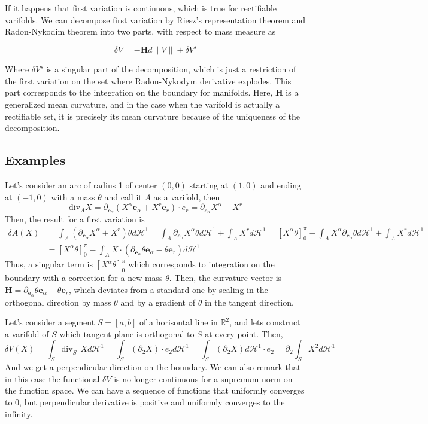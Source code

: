 \vspace{2ex}
If it happens that first variation is continuous, which is true for rectifiable
varifolds. We can decompose first variation by Riesz's representation theorem and
Radon-Nykodim theorem into two parts, with respect to mass measure as

\[\delta V = -\mathbf Hd\|V\|+\delta V^s\]

Where $\delta V^s$ is a singular part of the decomposition, which is just a restriction
of the first variation on the set where Radon-Nykodym derivative explodes. This
part corresponds to the integration on the boundary for manifolds. Here, $\mathbf H$
is a generalized mean curvature, and in the case when the varifold is actually
a rectifiable set, it is precisely its mean curvature because of the uniqueness of
the decomposition.

\subsection{Examples}
Let's consider an arc of radius 1 of center $(0,0)$ starting at $(1,0)$
and ending at $(-1,0)$ with a mass $\theta$ and call it $A$ as a varifold, then
\[\text{div}_AX=\partial_{\mathbf e_\alpha}(X^\alpha\mathbf e_\alpha+X^r\mathbf e_r)\cdot e_r
=\partial_{\mathbf e_\alpha}X^\alpha+X^r\]
Then, the result for a first variation is
\begin{align*}
\delta A(X)&=\int_A(\partial_{\mathbf e_\alpha}X^\alpha+X^r)\theta d\mathcal H^1
=\int_A\partial_{\mathbf e_\alpha}X^\alpha\theta d\mathcal H^1+\int_A X^rd\mathcal H^1
=[X^\alpha\theta]_0^\pi-\int_AX^\alpha\partial_{\mathbf e_\alpha}\theta d\mathcal H^1+\int_A X^rd\mathcal H^1\\
&=[X^\alpha\theta]_0^\pi-\int_AX\cdot(\partial_{\mathbf e_\alpha}\theta\mathbf e_\alpha-\theta\mathbf e_r)d\mathcal H^1
\end{align*}
Thus, a singular term is $[X^\alpha\theta]_0^\pi$ which corresponds to integration
on the boundary with a correction for a new mass $\theta$. Then, the curvature vector
is $\mathbf H=\partial_{\mathbf e_\alpha}\theta\mathbf e_\alpha-\theta\mathbf e_r$,
which deviates from a standard one by scaling in the orthogonal direction by mass
$\theta$ and by a gradient of $\theta$ in the tangent direction.

\vspace{2ex}
Let's consider a segment $S=[a,b]$ of a horisontal line in $\mathbb R^2$, and lets construct a
varifold of $S$ which tangent plane is orthogonal to $S$ at every point. Then,
\[\delta V(X) = \int_S\text{div}_{S^\bot}Xd\mathcal H^1 = \int_S(\partial_2 X)\cdot e_2d\mathcal H^1=
\int_S(\partial_2 X)d\mathcal H^1\cdot e_2=\partial_2\int_S X^2d\mathcal H^1\]
And we get a perpendicular direction on the boundary. We can also remark that in
this case the functional $\delta V$ is no longer continuous for a supremum norm on
the function space. We can have a sequence of functions that uniformly converges
to 0, but perpendicular derivative is positive and uniformly converges to the
infinity.

